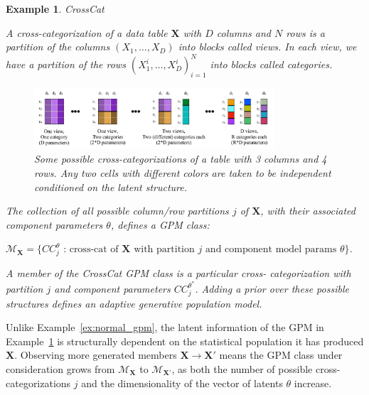 \documentclass[10pt,letterpaper]{article}
\newtheorem{example}{Example}[section]
\newcommand{\set}[1]{\{#1\}}
\begin{document}
\begin{example} \label{ex:crosscat} CrossCat

A cross-categorization of a data table $\mathbf{X}$ with $D$ columns and $N$ rows is
a partition of the columns $(X_1,\dots,X_D)$ into blocks called \textit{views}.
In each view, we have a partition of the rows $(X_1^{i},\dots,X_D^{i})_{i=1}^N$
into blocks called \textit{categories}.

\begin{figure}[ht]
    \centering
\includegraphics[width=0.8\textwidth]{cc.jpeg}
\caption{Some possible cross-categorizations of a table with 3 columns
  and 4 rows.  Any two cells with different colors are taken to be
  independent conditioned on the latent structure.}
\label{fig:cc}
\end{figure}
The collection of all possible column/row partitions $j$ of
$\mathbf{X}$, with their associated component parameters $\theta$,
defines a GPM class:

$\mathcal{M}_\textbf{X} = \set{CC_j^{\theta} \text{ : cross-cat of } \mathbf{X}
\text{ with partition } j \text{ and component model params } \theta}$.

A member of the CrossCat GPM class is a particular
cross- categorization with partition $j$ and component parameters
$CC_j^{\theta^*}$.  Adding a prior over these possible structures
defines an adaptive generative population model.
\end{example}

Unlike Example~\ref{ex:normal_gpm}, the latent information of the GPM
in Example~\ref{ex:crosscat} is structurally dependent on
the statistical population it has produced $\mathbf{X}$. Observing more
generated members $\mathbf{X} \to
\mathbf{X}'$ means the GPM class under consideration grows from
$\mathcal{M}_\textbf{X}$ to $\mathcal{M}_\textbf{X'}$, as both the number of
possible cross-categorizations $j$ and the dimensionality of the vector of
latents $\theta$ increase.

\end{document}
